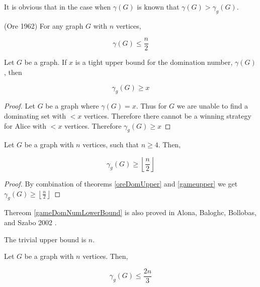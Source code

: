     It is obvious that in the case when $\gamma(G)$ is known that $\gamma(G) > \gamma_g(G)$.
    
\begin{theorem}(Ore 1962) \label{oreDomUpper} \cite{oysteinore1962}
    For any graph $G$ with $n$ vertices, 
    
    \[\gamma(G) \leq \frac{n}{2}\]
\end{theorem}

\begin{theorem}\label{gameupper}
    Let $G$ be a graph. If $x$ is a tight upper bound for the domination number, $\gamma(G)$, then  
    
    \[ \gamma_g(G) \geq x\]
\end{theorem}

\begin{proof}
    Let $G$ be a graph where $\gamma(G) = x$.
    Thus for $G$ we are unable to find a dominating set with $ < x$ vertices.
    Therefore there cannot be a winning strategy for Alice with $< x$ vertices.
    Therefore $\gamma_g(G) \geq x$
\end{proof}


\begin{theorem} \label{gameDomNumLowerBound}
    Let $G$ be a graph with $n$ vertices, such that $n \geq 4$. Then,
    
    \[ \gamma_g(G) \geq \left \lfloor{\frac{n}{2}}\right \rfloor \]
    
\end{theorem}

\begin{proof}
    By combination of theorems \ref{oreDomUpper} and \ref{gameupper} we get  $ \gamma_g(G) \geq \left \lfloor{\frac{n}{2}}\right \rfloor $
\end{proof}

Thereom \ref{gameDomNumLowerBound} is also proved in Alona, Baloghc, Bollobas, and Szabo 2002 \cite{AlBABoSz2002}.

The trivial upper bound is $n$.

\begin{theorem}
    Let $G$ be a graph with $n$ vertices. Then,
    
    \[ \gamma_g(G) \leq \frac{2n}{3}\]
\end{theorem}
 
